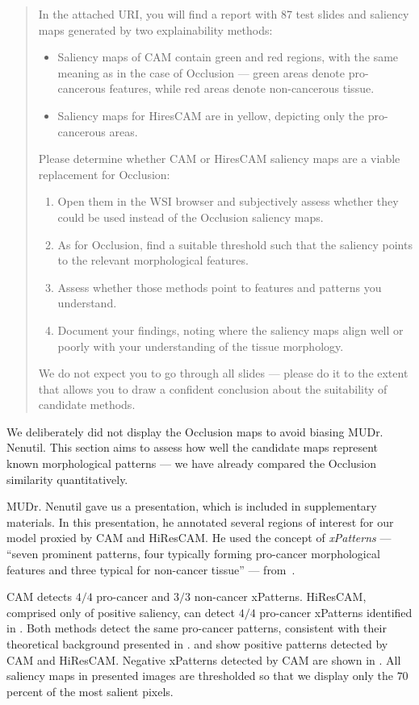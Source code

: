 \begin{doublebar}
\begin{quote}
In the attached URI, you will find a report with 87 test slides and saliency maps generated by two explainability methods:
\begin{itemize}
    \item Saliency maps of CAM contain green and red regions, with the same meaning as in the case of Occlusion --- green areas denote pro-cancerous features, while red areas denote non-cancerous tissue.
    \item Saliency maps for HiresCAM are in yellow, depicting only the pro-cancerous areas.
\end{itemize}
Please determine whether CAM or HiresCAM saliency maps are a viable replacement for Occlusion:
\begin{enumerate}
    \item Open them in the WSI browser and subjectively assess whether they could be used instead of the Occlusion saliency maps.
    \item As for Occlusion, find a suitable threshold such that the saliency points to the relevant morphological features.
    \item Assess whether those methods point to features and patterns you understand.
    \item Document your findings, noting where the saliency maps align well or poorly with your understanding of the tissue morphology.
\end{enumerate}
We do not expect you to go through all slides --- please do it to the extent that allows you to draw a confident conclusion about the suitability of candidate methods.
\end{quote}
\end{doublebar}
We deliberately did not display the Occlusion maps to avoid biasing MUDr. Nenutil.
This section aims to assess how well the candidate maps represent known morphological patterns --- we have already compared the Occlusion similarity quantitatively.

MUDr. Nenutil gave us a presentation, which is included in supplementary materials.
In this presentation, he annotated several regions of interest for our model proxied by CAM and HiResCAM.
He used the concept of \emph{xPatterns} --- ``seven prominent patterns, four
typically forming pro-cancer morphological features and three typical
for non-cancer tissue'' --- from~\cite{gallo}.

CAM detects $4/4$ pro-cancer and $3/3$ non-cancer xPatterns.
HiResCAM, comprised only of positive saliency, can detect $4/4$ pro-cancer xPatterns identified in \cite{gallo}.
Both methods detect the same pro-cancer patterns, consistent with their theoretical background presented in .
 and  show positive patterns detected by CAM and HiResCAM.
Negative xPatterns detected by CAM are shown in .
All saliency maps in presented images are thresholded so that we display only the $70$ percent of the most salient pixels.

